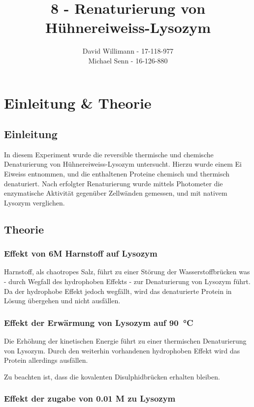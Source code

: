 \documentclass[a4paper]{scrreprt}
\title{8 - Renaturierung von Hühnereiweiss-Lysozym}
\author{David Willimann \maillink{david.willimann@students.unibe.ch} - 17-118-977 \\ Michael Senn \maillink{michael.senn@students.unibe.ch} - 16-126-880}
\date{\printdate}
\begin{document}
\maketitle

\chapter{Einleitung \& Theorie}

\section{Einleitung}

In diesem Experiment wurde die reversible thermische und chemische
Denaturierung von Hühnereiweiss-Lysozym untersucht. Hierzu wurde einem Ei
Eiweiss entnommen, und die enthaltenen Proteine chemisch und thermisch
denaturiert. Nach erfolgter Renaturierung wurde mittels Photometer die
enzymatische Aktivität gegenüber Zellwänden gemessen, und mit nativem Lysozym
verglichen.

\section{Theorie}

\subsection{Effekt von 6M Harnstoff auf Lysozym}

Harnstoff, als chaotropes Salz, führt zu einer Störung der Wasserstoffbrücken
was - durch Wegfall des hydrophoben Effekts - zur Denaturierung von Lysozym
führt. Da der hydrophobe Effekt jedoch wegfällt, wird das denaturierte Protein
in Lösung übergehen und nicht ausfällen.

\subsection{Effekt der Erwärmung von Lysozym auf \SI{90}{\celsius}}

Die Erhöhung der kinetischen Energie führt zu einer thermischen Denaturierung
von Lysozym. Durch den weiterhin vorhandenen hydrophoben Effekt wird das
Protein allerdings ausfällen.

Zu beachten ist, dass die kovalenten Disulphidbrücken erhalten bleiben.

\subsection{Effekt der zugabe von 0.01 M  zu Lysozym}
\end{document}
